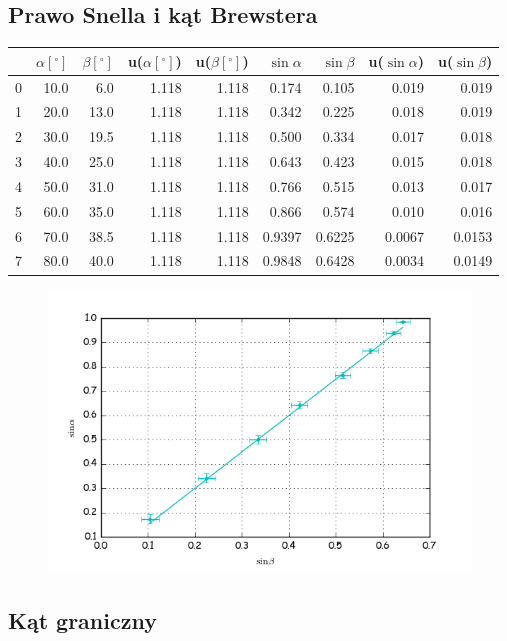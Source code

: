 \documentclass[a4paper,10pt]{article}
\begin{document}
\subsection{Prawo Snella i kąt Brewstera}

\begin{tabular}{lrrrrrrrr}
\toprule
{}&$\alpha[^\circ]$&$\beta[^\circ]$&u($\alpha[^\circ]$)&u($\beta[^\circ]$)&$\sin{\alpha}$&$\sin{\beta}$&u($\sin{\alpha}$)&u($\sin{\beta}$) \\
\midrule
0 & 10.0 &  6.0 & 1.118 & 1.118 & 0.174 & 0.105 & 0.019 & 0.019 \\
1 & 20.0 & 13.0 & 1.118 & 1.118 & 0.342 & 0.225 & 0.018 & 0.019 \\
2 & 30.0 & 19.5 & 1.118 & 1.118 & 0.500 & 0.334 & 0.017 & 0.018 \\
3 & 40.0 & 25.0 & 1.118 & 1.118 & 0.643 & 0.423 & 0.015 & 0.018 \\
4 & 50.0 & 31.0 & 1.118 & 1.118 & 0.766 & 0.515 & 0.013 & 0.017 \\
5 & 60.0 & 35.0 & 1.118 & 1.118 & 0.866 & 0.574 & 0.010 & 0.016 \\
6 & 70.0 & 38.5 & 1.118 & 1.118 & 0.9397 & 0.6225 & 0.0067 & 0.0153 \\
7 & 80.0 & 40.0 & 1.118 & 1.118 & 0.9848 & 0.6428 & 0.0034 & 0.0149 \\
\bottomrule
\end{tabular}

\begin{figure}[H]
  \includegraphics{./snella.png}
  \caption{}
  \label{}
\end{figure}

\subsection{Kąt graniczny}
\end{document}
